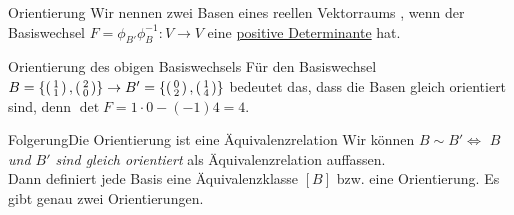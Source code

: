 \begin{Def}
{Orientierung}
Wir nennen zwei Basen eines reellen Vektorraums , wenn der Basiswechsel $F=\phi_{B'}\phi_B^{-1}: V\to V$ eine \underline{positive Determinante} hat.\\
\end{Def}

\begin{Beispiel}
{Orientierung des obigen Basiswechsels}
Für den Basiswechsel $B=\left\{\left(\begin{smallmatrix}1\\1\end{smallmatrix}\right),\left(\begin{smallmatrix}2\\0\end{smallmatrix}\right)\right\}\to B'=\left\{\left(\begin{smallmatrix}0\\2\end{smallmatrix}\right),\left(\begin{smallmatrix}1\\4\end{smallmatrix}\right)\right\}$ bedeutet das, dass die Basen gleich orientiert sind, denn $\det F= 1\cdot 0-(-1)4=4$.
\end{Beispiel}

\begin{Satz}{Folgerung}{Die Orientierung ist eine Äquivalenzrelation}
Wir können $B\sim B'\iff $ \textit{$B$ und $B'$ sind gleich orientiert} als Äquivalenzrelation auffassen.\\
Dann definiert jede Basis eine Äquivalenzklasse $[B]$ bzw. eine Orientierung. Es gibt genau zwei Orientierungen.
\end{Satz}

